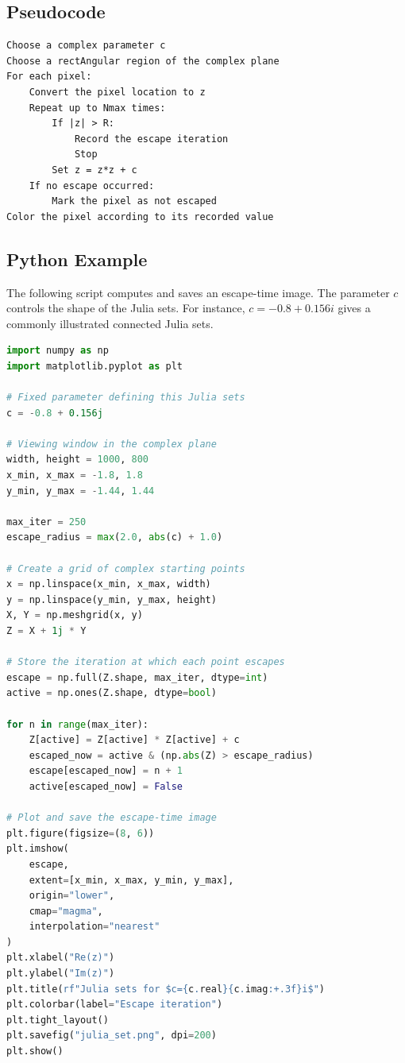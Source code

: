 \documentclass[a4paper, 10pt, onepage]{elegantbook}
\begin{document}
{\subsection{Pseudocode}

\begin{lstlisting}
Choose a complex parameter c
Choose a rectAngular region of the complex plane
For each pixel:
    Convert the pixel location to z
    Repeat up to Nmax times:
        If |z| > R:
            Record the escape iteration
            Stop
        Set z = z*z + c
    If no escape occurred:
        Mark the pixel as not escaped
Color the pixel according to its recorded value
\end{lstlisting}

\subsection{Python Example}

\noindent

The following script computes and saves an escape-time image. The
parameter \(c\) controls the shape of the Julia sets. For instance,
\(c=-0.8+0.156i\) gives a commonly illustrated connected Julia sets.

\begin{lstlisting}[language=Python]
import numpy as np
import matplotlib.pyplot as plt

# Fixed parameter defining this Julia sets
c = -0.8 + 0.156j

# Viewing window in the complex plane
width, height = 1000, 800
x_min, x_max = -1.8, 1.8
y_min, y_max = -1.44, 1.44

max_iter = 250
escape_radius = max(2.0, abs(c) + 1.0)

# Create a grid of complex starting points
x = np.linspace(x_min, x_max, width)
y = np.linspace(y_min, y_max, height)
X, Y = np.meshgrid(x, y)
Z = X + 1j * Y

# Store the iteration at which each point escapes
escape = np.full(Z.shape, max_iter, dtype=int)
active = np.ones(Z.shape, dtype=bool)

for n in range(max_iter):
    Z[active] = Z[active] * Z[active] + c
    escaped_now = active & (np.abs(Z) > escape_radius)
    escape[escaped_now] = n + 1
    active[escaped_now] = False

# Plot and save the escape-time image
plt.figure(figsize=(8, 6))
plt.imshow(
    escape,
    extent=[x_min, x_max, y_min, y_max],
    origin="lower",
    cmap="magma",
    interpolation="nearest"
)
plt.xlabel("Re(z)")
plt.ylabel("Im(z)")
plt.title(rf"Julia sets for $c={c.real}{c.imag:+.3f}i$")
plt.colorbar(label="Escape iteration")
plt.tight_layout()
plt.savefig("julia_set.png", dpi=200)
plt.show()
\end{lstlisting}

}
\end{document}
